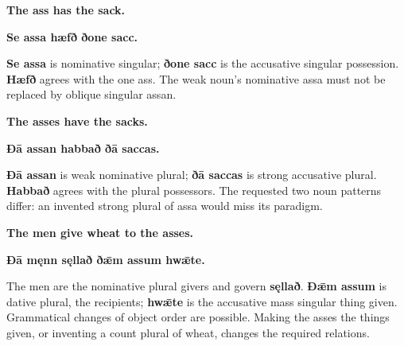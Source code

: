\par\begin{minipage}{\linewidth}\raggedright
\textbf{The ass has the sack.}

\textbf{Se assa hæfð ðone sacc.}
\end{minipage}\par

\textbf{Se assa} is nominative singular; \textbf{ðone sacc} is the accusative singular possession. \textbf{Hæfð} agrees with the one ass. The weak noun’s nominative assa must not be replaced by oblique singular assan.

\par\begin{minipage}{\linewidth}\raggedright
\textbf{The asses have the sacks.}

\textbf{Ðā assan habbað ðā saccas.}
\end{minipage}\par

\textbf{Ðā assan} is weak nominative plural; \textbf{ðā saccas} is strong accusative plural. \textbf{Habbað} agrees with the plural possessors. The requested two noun patterns differ: an invented strong plural of assa would miss its paradigm.

\par\begin{minipage}{\linewidth}\raggedright
\textbf{The men give wheat to the asses.}

\textbf{Ðā męnn sęllað ðǣm assum hwǣte.}
\end{minipage}\par

The men are the nominative plural givers and govern \textbf{sęllað}. \textbf{Ðǣm assum} is dative plural, the recipients; \textbf{hwǣte} is the accusative mass singular thing given. Grammatical changes of object order are possible. Making the asses the things given, or inventing a count plural of wheat, changes the required relations.

